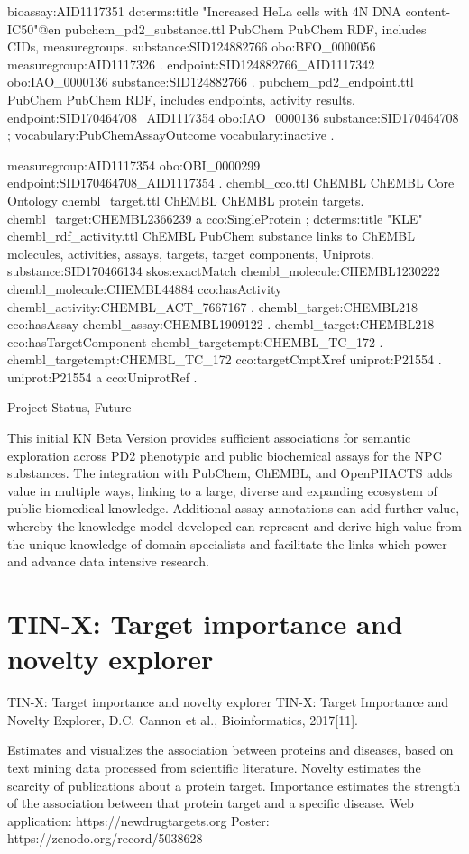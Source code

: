 bioassay:AID1117351 dcterms:title "Increased HeLa cells with 4N DNA content-IC50"@en 
pubchem\_pd2\_substance.ttl
PubChem
PubChem RDF, includes CIDs, measuregroups.
substance:SID124882766 obo:BFO\_0000056 measuregroup:AID1117326 .
endpoint:SID124882766\_AID1117342 obo:IAO\_0000136 substance:SID124882766 .
pubchem\_pd2\_endpoint.ttl
PubChem
PubChem RDF, includes endpoints, activity results.
endpoint:SID170464708\_AID1117354
    obo:IAO\_0000136 substance:SID170464708 ;
    vocabulary:PubChemAssayOutcome vocabulary:inactive .

measuregroup:AID1117354 obo:OBI\_0000299 endpoint:SID170464708\_AID1117354 .
chembl\_cco.ttl
ChEMBL
ChEMBL Core Ontology
chembl\_target.ttl
ChEMBL
ChEMBL protein targets.
chembl\_target:CHEMBL2366239 a cco:SingleProtein ;
        dcterms:title "KLE"
chembl\_rdf\_activity.ttl
ChEMBL
PubChem substance links to ChEMBL molecules, activities, assays, targets, target components, Uniprots.
substance:SID170466134 skos:exactMatch chembl\_molecule:CHEMBL1230222
chembl\_molecule:CHEMBL44884 cco:hasActivity chembl\_activity:CHEMBL\_ACT\_7667167 .
chembl\_target:CHEMBL218 cco:hasAssay chembl\_assay:CHEMBL1909122 .
chembl\_target:CHEMBL218 cco:hasTargetComponent chembl\_targetcmpt:CHEMBL\_TC\_172 .
chembl\_targetcmpt:CHEMBL\_TC\_172 cco:targetCmptXref uniprot:P21554 .
uniprot:P21554 a cco:UniprotRef .


Project Status, Future

This initial KN Beta Version provides sufficient associations for semantic exploration across PD2 phenotypic and public biochemical assays for the NPC substances.  The integration with PubChem, ChEMBL, and OpenPHACTS adds value in multiple ways, linking to a large, diverse and expanding ecosystem of public biomedical knowledge.  Additional assay annotations can add further value, whereby the knowledge model developed can represent and derive high value from the unique knowledge of domain specialists and facilitate the links which power and advance data intensive research.



\section{TIN-X: Target importance and novelty explorer}

TIN-X: Target importance and novelty explorer
TIN-X: Target Importance and Novelty Explorer, D.C. Cannon et al., Bioinformatics, 2017[11].

Estimates and visualizes the association between proteins and diseases, based on text mining data processed from scientific literature.  Novelty estimates the scarcity of publications about a protein target. Importance estimates the strength of the association between that protein target and a specific disease.
Web application: https://newdrugtargets.org
Poster: https://zenodo.org/record/5038628


